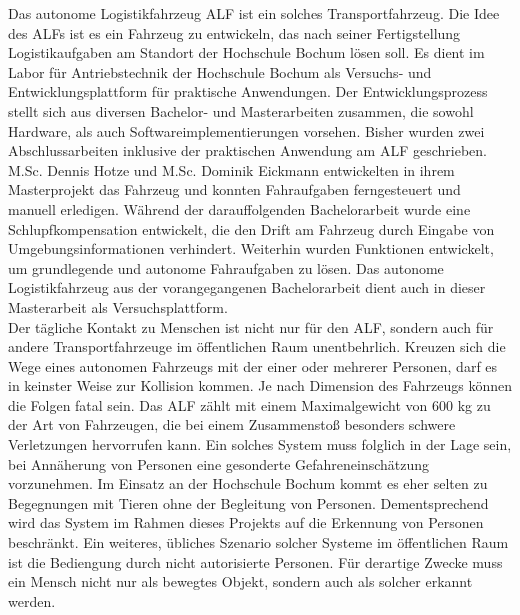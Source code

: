 		Das autonome Logistikfahrzeug ALF ist ein solches Transportfahrzeug. Die Idee des ALFs ist es ein Fahrzeug zu entwickeln, das nach seiner Fertigstellung Logistikaufgaben am Standort der Hochschule Bochum lösen soll. Es dient im Labor für Antriebstechnik der Hochschule Bochum als Versuchs- und Entwicklungsplattform für praktische Anwendungen. Der Entwicklungsprozess stellt sich aus diversen Bachelor- und Masterarbeiten zusammen, die sowohl Hardware, als auch Softwareimplementierungen vorsehen. Bisher wurden zwei Abschlussarbeiten inklusive der praktischen Anwendung am ALF geschrieben. M.Sc. Dennis Hotze und M.Sc. Dominik Eickmann entwickelten in ihrem Masterprojekt das Fahrzeug und konnten Fahraufgaben ferngesteuert und manuell erledigen. Während der darauffolgenden Bachelorarbeit wurde eine Schlupfkompensation entwickelt, die den Drift am Fahrzeug durch Eingabe von Umgebungsinformationen verhindert. Weiterhin wurden Funktionen entwickelt, um grundlegende und autonome Fahraufgaben zu lösen. Das autonome Logistikfahrzeug aus der vorangegangenen Bachelorarbeit dient auch in dieser Masterarbeit als Versuchsplattform.\\
		
		Der tägliche Kontakt zu Menschen ist nicht nur für den ALF, sondern auch für andere Transportfahrzeuge im öffentlichen Raum unentbehrlich. Kreuzen sich die Wege eines autonomen Fahrzeugs mit der einer oder mehrerer Personen, darf es in keinster Weise zur Kollision kommen. Je nach Dimension des Fahrzeugs können die Folgen fatal sein. Das ALF zählt mit einem Maximalgewicht von 600 kg zu der Art von Fahrzeugen, die bei einem Zusammenstoß besonders schwere Verletzungen hervorrufen kann. Ein solches System muss folglich in der Lage sein, bei Annäherung von Personen eine gesonderte Gefahreneinschätzung vorzunehmen. Im Einsatz an der Hochschule Bochum kommt es eher selten zu Begegnungen mit Tieren ohne der Begleitung von Personen. Dementsprechend wird das System im Rahmen dieses Projekts auf die Erkennung von Personen beschränkt. Ein weiteres, übliches Szenario solcher Systeme im öffentlichen Raum ist die Bediengung durch nicht autorisierte Personen. Für derartige Zwecke muss ein Mensch nicht nur als bewegtes Objekt, sondern auch als solcher erkannt werden. \\
		
